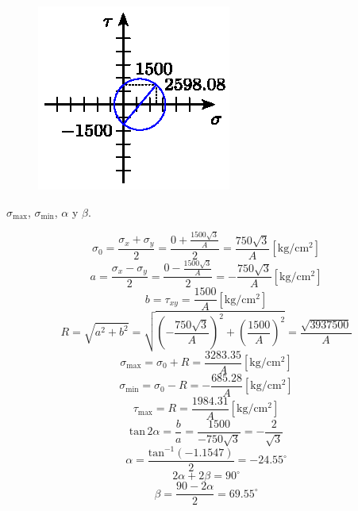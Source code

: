\documentclass[letter,10pt,twoside]{article}
\begin{document}
\begin{figure}[H]
\centering
\includegraphics[scale=1.2]{resources/f71.eps}
\end{figure}

$\sigma_{\text{max}}$, $\sigma_{\text{min}}$, $\alpha$ y $\beta$.

\begin{equation*}
    \sigma_0 = \frac{\sigma_x + \sigma_y}{2}
             = \frac{0 + \frac{1500\sqrt{3}}{A}}{2}
             = \frac{750\sqrt{3}}{A}[\text{kg}/\text{cm}^2]
\end{equation*}
\begin{equation*}
    a = \frac{\sigma_x - \sigma_y}{2}
      = \frac{0 - \frac{1500\sqrt{3}}{A}}{2}
      = - \frac{750\sqrt{3}}{A}[\text{kg}/\text{cm}^2]
\end{equation*}
\begin{equation*}
    b = \tau_{xy}
      = \frac{1500}{A}[\text{kg}/\text{cm}^2]
\end{equation*}
\begin{equation*}
    R = \sqrt{a^2 + b^2}
      = \sqrt{\left(-\frac{750\sqrt{3}}{A}\right)^2
        + \left(\frac{1500}{A}\right)^2}
      = \frac{\sqrt{3937500}}{A}
\end{equation*}
\begin{equation*}
    \sigma_{\text{max}} = \sigma_0 + R
                        = \frac{3283.35}{A}[\text{kg}/\text{cm}^2]
\end{equation*}
\begin{equation*}
    \sigma_{\text{min}} = \sigma_0 - R
                        = -\frac{685.28}{A}[\text{kg}/\text{cm}^2]
\end{equation*}
\begin{equation*}
    \tau_{\text{max}} = R
                      = \frac{1984.31}{A}[\text{kg}/\text{cm}^2]
\end{equation*}
\begin{equation*}
    \text{tan}\,2\alpha = \frac{b}{a}
                        = \frac{1500}{-750\sqrt{3}}
                        = -\frac{2}{\sqrt{3}}
\end{equation*}
\begin{equation*}
    \alpha = \frac{\text{tan}^{-1}(-1.1547)}{2}
           = -24.55^\circ
\end{equation*}
\begin{equation*}
    2\alpha + 2\beta = 90^\circ
\end{equation*}
\begin{equation*}
    \beta = \frac{90 - 2\alpha}{2}
          = 69.55^\circ
\end{equation*}
\end{document}

